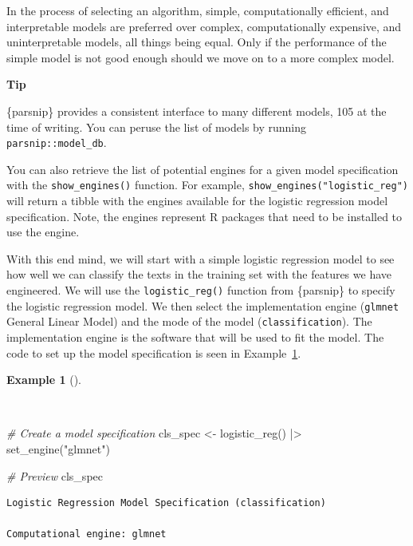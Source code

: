 \documentclass[
  letterpaper,
  krantz1]{latex/krantz-mod}
\newenvironment{Shaded}{\begin{snugshade}}{\end{snugshade}}
\newcommand{\CommentTok}[1]{\textcolor[rgb]{0.00,0.00,0.00}{\textit{#1}}}
\newcommand{\FunctionTok}[1]{\textcolor[rgb]{0.00,0.00,0.00}{#1}}
\newcommand{\NormalTok}[1]{\textcolor[rgb]{0.00,0.00,0.00}{#1}}
\newcommand{\OtherTok}[1]{\textcolor[rgb]{0.00,0.00,0.00}{#1}}
\newcommand{\SpecialCharTok}[1]{\textcolor[rgb]{0.00,0.00,0.00}{#1}}
\newcommand{\StringTok}[1]{\textcolor[rgb]{0.00,0.00,0.00}{#1}}
\theoremstyle{definition}
\newtheorem{example}{Example}[chapter]
\theoremstyle{definition}
\theoremstyle{remark}
\begin{document}
In the process of selecting an algorithm, simple, computationally
efficient, and interpretable models are preferred over complex,
computationally expensive, and uninterpretable models, all things being
equal. Only if the performance of the simple model is not good enough
should we move on to a more complex model.

\begin{tcolorbox}[enhanced jigsaw, leftrule=.75mm, colframe=quarto-callout-color-frame, left=2mm, colback=white, toprule=.15mm, breakable, arc=.35mm, opacityback=0, bottomrule=.15mm, rightrule=.15mm]

\textbf{ Tip}

\{parsnip\} provides a consistent interface to many different models,
105 at the time of writing. You can peruse the list of models by running
\texttt{parsnip::model\_db}.

You can also retrieve the list of potential engines for a given model
specification with the \texttt{show\_engines()} function. For example,
\texttt{show\_engines("logistic\_reg")} will return a tibble with the
engines available for the logistic regression model specification. Note,
the engines represent R packages that need to be installed to use the
engine.

\end{tcolorbox}

With this end mind, we will start with a simple logistic regression
model to see how well we can classify the texts in the training set with
the features we have engineered. We will use the
\texttt{logistic\_reg()} function from \{parsnip\} to specify the
logistic regression model. We then select the implementation engine
(\texttt{glmnet} General Linear Model) and the mode of the model
(\texttt{classification}). The implementation engine is the software
that will be used to fit the model. The code to set up the model
specification is seen in Example~\ref{exm-predict-class-model-spec}.

\begin{example}[]\protect\hypertarget{exm-predict-class-model-spec}{}\label{exm-predict-class-model-spec}

~

\begin{Shaded}
\begin{Highlighting}[numbers=left,,]
\CommentTok{\# Create a model specification}
\NormalTok{cls\_spec }\OtherTok{\textless{}{-}}
  \FunctionTok{logistic\_reg}\NormalTok{() }\SpecialCharTok{|\textgreater{}}
  \FunctionTok{set\_engine}\NormalTok{(}\StringTok{"glmnet"}\NormalTok{)}

\CommentTok{\# Preview}
\NormalTok{cls\_spec}
\end{Highlighting}
\end{Shaded}

\begin{verbatim}
Logistic Regression Model Specification (classification)

Computational engine: glmnet
\end{verbatim}

\end{example}
\end{document}
